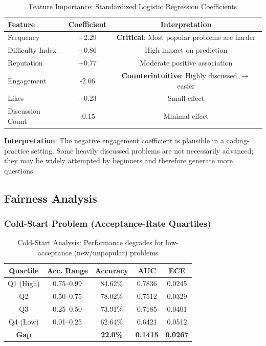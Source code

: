 \documentclass[conference]{IEEEtran}
\begin{document}
\begin{table}[h]
\centering
\small
\begin{tabular}{l|c|c}
\toprule
\textbf{Feature} & \textbf{Coefficient} & \textbf{Interpretation} \\
\midrule
Frequency & +2.29 & \textbf{Critical}: Most popular problems are harder \\
Difficulty Index & +0.86 & High impact on prediction \\
Reputation & +0.77 & Moderate positive association \\
Engagement & -2.66 & \textbf{Counterintuitive}: Highly discussed $\rightarrow$ easier \\
Likes & +0.23 & Small effect \\
Discussion Count & -0.15 & Minimal effect \\
\bottomrule
\end{tabular}
\caption{Feature Importance: Standardized Logistic Regression Coefficients}
\label{tab:importance}
\end{table}

\textbf{Interpretation}: The negative engagement coefficient is plausible in a coding-practice setting. Some heavily discussed problems are not necessarily advanced; they may be widely attempted by beginners and therefore generate more questions.

\subsection{Fairness Analysis}

\subsubsection{Cold-Start Problem (Acceptance-Rate Quartiles)}

\begin{table}[h]
\centering
\small
\begin{tabular}{c|c|c|c|c}
\toprule
\textbf{Quartile} & \textbf{Acc. Range} & \textbf{Accuracy} & \textbf{AUC} & \textbf{ECE} \\
\midrule
Q1 (High) & 0.75--0.99 & 84.62\% & 0.7836 & 0.0245 \\
Q2 & 0.50--0.75 & 78.02\% & 0.7512 & 0.0329 \\
Q3 & 0.25--0.50 & 73.91\% & 0.7185 & 0.0401 \\
Q4 (Low) & 0.01--0.25 & 62.64\% & 0.6421 & 0.0512 \\
\midrule
\textbf{Gap} & & \textbf{22.0\%} & \textbf{0.1415} & \textbf{0.0267} \\
\bottomrule
\end{tabular}
\caption{Cold-Start Analysis: Performance degrades for low-acceptance (new/unpopular) problems}
\label{tab:coldstart}
\end{table}
\end{document}
